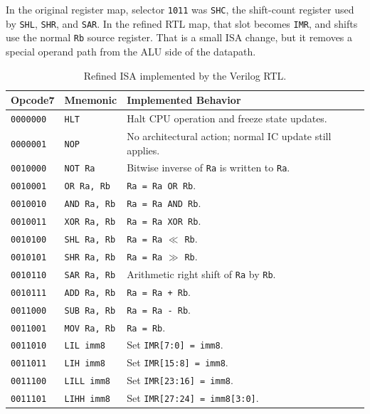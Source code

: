 \documentclass[12pt,a4paper]{article}
\begin{document}
In the original register map, selector \texttt{1011} was \texttt{SHC}, the shift-count register used by \texttt{SHL}, \texttt{SHR}, and \texttt{SAR}. In the refined RTL map, that slot becomes \texttt{IMR}, and shifts use the normal \texttt{Rb} source register. That is a small ISA change, but it removes a special operand path from the ALU side of the datapath.

\begin{table}[H]
\centering
\small
\caption{Refined ISA implemented by the Verilog RTL.}
\begin{tabularx}{\linewidth}{|l|l|Y|}
\hline
\textbf{Opcode7} & \textbf{Mnemonic} & \textbf{Implemented Behavior} \\ \hline
\texttt{0000000} & \texttt{HLT} & Halt CPU operation and freeze state updates. \\ \hline
\texttt{0000001} & \texttt{NOP} & No architectural action; normal IC update still applies. \\ \hline
\texttt{0010000} & \texttt{NOT Ra} & Bitwise inverse of \texttt{Ra} is written to \texttt{Ra}. \\ \hline
\texttt{0010001} & \texttt{OR Ra, Rb} & \texttt{Ra = Ra OR Rb}. \\ \hline
\texttt{0010010} & \texttt{AND Ra, Rb} & \texttt{Ra = Ra AND Rb}. \\ \hline
\texttt{0010011} & \texttt{XOR Ra, Rb} & \texttt{Ra = Ra XOR Rb}. \\ \hline
\texttt{0010100} & \texttt{SHL Ra, Rb} & \texttt{Ra = Ra} $\ll$ \texttt{Rb}. \\ \hline
\texttt{0010101} & \texttt{SHR Ra, Rb} & \texttt{Ra = Ra} $\gg$ \texttt{Rb}. \\ \hline
\texttt{0010110} & \texttt{SAR Ra, Rb} & Arithmetic right shift of \texttt{Ra} by \texttt{Rb}. \\ \hline
\texttt{0010111} & \texttt{ADD Ra, Rb} & \texttt{Ra = Ra + Rb}. \\ \hline
\texttt{0011000} & \texttt{SUB Ra, Rb} & \texttt{Ra = Ra - Rb}. \\ \hline
\texttt{0011001} & \texttt{MOV Ra, Rb} & \texttt{Ra = Rb}. \\ \hline
\texttt{0011010} & \texttt{LIL imm8} & Set \texttt{IMR[7:0] = imm8}. \\ \hline
\texttt{0011011} & \texttt{LIH imm8} & Set \texttt{IMR[15:8] = imm8}. \\ \hline
\texttt{0011100} & \texttt{LILL imm8} & Set \texttt{IMR[23:16] = imm8}. \\ \hline
\texttt{0011101} & \texttt{LIHH imm8} & Set \texttt{IMR[27:24] = imm8[3:0]}. \\ \hline

\end{tabularx}
\end{table}
\end{document}
